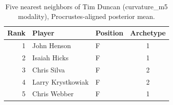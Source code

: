 \begin{table}[htbp]
  \centering\small
  \begin{tabular}{rllc}
    \toprule
    Rank & Player & Position & Archetype \\
    \midrule
    1 & John Henson & F & 1 \\
    2 & Isaiah Hicks & F & 1 \\
    3 & Chris Silva & F & 2 \\
    4 & Larry Krystkowiak & F & 2 \\
    5 & Chris Webber & F & 1 \\
    \bottomrule
  \end{tabular}
  \caption{Five nearest neighbors of Tim Duncan (curvature_m5 modality), Procrustes-aligned posterior mean.}
  \label{tab:Tim_Duncan_neighbors_curvature_m5}
\end{table}

